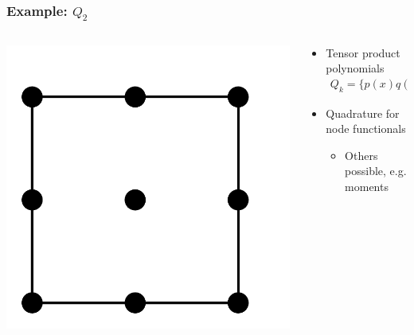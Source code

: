 \begin{frame}
  \frametitle{Example: $Q_2$}
  \begin{columns}
    \begin{column}{.35\textwidth}
      \includegraphics[width=\textwidth]{graph/nodes_q2}
    \end{column}
    \begin{column}{.65\textwidth}
      \begin{itemize}
      \item Tensor product polynomials
        \begin{gather*}
          Q_k = \bigl\{p(x)q(y)\big|
          p,q\in P_2\bigr\}
        \end{gather*}
      \item Quadrature for node functionals
        \begin{itemize}
        \item Others possible, e.g. moments
        \end{itemize}
      \end{itemize}
    \end{column}
  \end{columns}
\end{frame}

